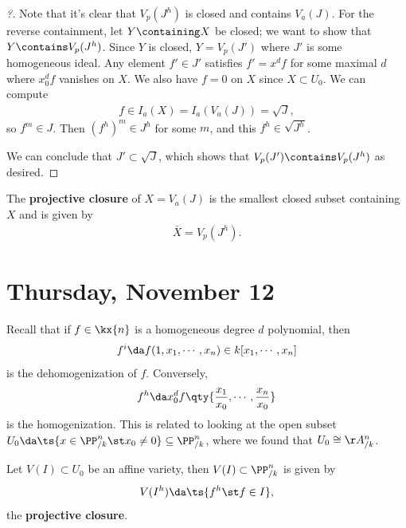\begin{proof}[?]

Note that it's clear that \(V_p(J^h)\) is closed and contains
\(V_a(J)\). For the reverse containment, let \(Y\containing X\) be
closed; we want to show that \(Y\contains V_p(J^h)\). Since \(Y\) is
closed, \(Y = V_p(J')\) where \(J'\) is some homogeneous ideal. Any
element \(f'\in J'\) satisfies \(f' = x^d f\) for some maximal \(d\)
where \(x_0^d f\) vanishes on \(X\). We also have \(f=0\) on \(X\) since
\(X\subset U_0\). We can compute
\begin{align*}  
f\in I_a(X) = I_a(V_a(J)) = \sqrt J
,\end{align*} so \(f^m\in J\). Then \((f^h)^m \in J^h\) for some \(m\),
and this \(f^h \in \sqrt{J^h}\).

We can conclude that \(J'\subset \sqrt J\), which shows that
\(V_p(J') \contains V_p(J^h)\) as desired.

\end{proof}

\begin{definition}

The \textbf{projective closure} of \(X = V_a(J)\) is the smallest closed
subset containing \(X\) and is given by
\begin{align*}  
\bar{X} = V_p(J^h)
.\end{align*}

\end{definition}

\hypertarget{thursday-november-12}{%
\section{Thursday, November 12}\label{thursday-november-12}}

Recall that if \(f\in \kx{n}\) is a homogeneous degree \(d\) polynomial,
then
\begin{align*}
f^i \da f(1, x_1, \cdots, x_n) \in k[x_1,\cdots, x_n]
\end{align*} is the dehomogenization of \(f\). Conversely,
\begin{align*}
f^h \da x_0^d f\qty{ {x_1 \over x_0}, \cdots, {x_n \over x_0} }
\end{align*} is the homogenization. This is related to looking at the
open subset
\(U_0 \da \ts{ x\in \PP^n_{/k} \st x_0\neq 0} \subseteq \PP^n_{/k}\),
where we found that \(U_0 \cong \AA^n_{/k}\).

\begin{proposition}

Let \(V(I) \subset U_0\) be an affine variety, then
\(V(I) \subset \PP^n_{/k}\) is given by
\begin{align*}
V(I^h) \da \ts{f^h \st f\in I}
,\end{align*} the \textbf{projective closure}.

\end{proposition}

